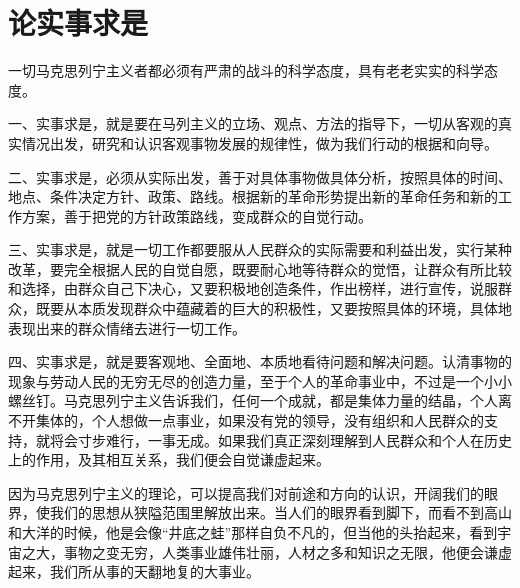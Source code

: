 \section[论实事求是 ]{论实事求是 }


一切马克思列宁主义者都必须有严肃的战斗的科学态度，具有老老实实的科学态度。

一、实事求是，就是要在马列主义的立场、观点、方法的指导下，一切从客观的真实情况出发，研究和认识客观事物发展的规律性，做为我们行动的根据和向导。

二、实事求是，必须从实际出发，善于对具体事物做具体分析，按照具体的时间、地点、条件决定方针、政策、路线。根据新的革命形势提出新的革命任务和新的工作方案，善于把党的方针政策路线，变成群众的自觉行动。

三、实事求是，就是一切工作都要服从人民群众的实际需要和利益出发，实行某种改革，要完全根据人民的自觉自愿，既要耐心地等待群众的觉悟，让群众有所比较和选择，由群众自己下决心，又要积极地创造条件，作出榜样，进行宣传，说服群众，既要从本质发现群众中蕴藏着的巨大的积极性，又要按照具体的环境，具体地表现出来的群众情绪去进行一切工作。

四、实事求是，就是要客观地、全面地、本质地看待问题和解决问题。认清事物的现象与劳动人民的无穷无尽的创造力量，至于个人的革命事业中，不过是一个小小螺丝钉。马克思列宁主义告诉我们，任何一个成就，都是集体力量的结晶，个人离不开集体的，个人想做一点事业，如果没有党的领导，没有组织和人民群众的支持，就将会寸步难行，一事无成。如果我们真正深刻理解到人民群众和个人在历史上的作用，及其相互关系，我们便会自觉谦虚起来。

因为马克思列宁主义的理论，可以提高我们对前途和方向的认识，开阔我们的眼界，使我们的思想从狭隘范围里解放出来。当人们的眼界看到脚下，而看不到高山和大洋的时候，他是会像“井底之蛙”那样自负不凡的，但当他的头抬起来，看到宇宙之大，事物之变无穷，人类事业雄伟壮丽，人材之多和知识之无限，他便会谦虚起来，我们所从事的天翻地复的大事业。



